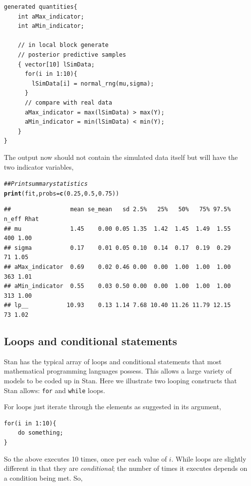 \documentclass[11pt,fullpage]{book}
\makeatletter
\newenvironment{kframe}{%
	\def\at@end@of@kframe{}%
	\ifinner\ifhmode%
	\def\at@end@of@kframe{\end{minipage}}%
\begin{minipage}{\columnwidth}%
	\fi\fi%
	\def\FrameCommand##1{\hskip\@totalleftmargin \hskip-\fboxsep
		\colorbox{shadecolor}{##1}\hskip-\fboxsep
		\hskip-\linewidth \hskip-\@totalleftmargin \hskip\columnwidth}%
	\MakeFramed {\advance\hsize-\width
		\@totalleftmargin\z@ \linewidth\hsize
		\@setminipage}}%
{\par\unskip\endMakeFramed%
	\at@end@of@kframe}
\newcommand{\hlnum}[1]{\textcolor[rgb]{0.686,0.059,0.569}{#1}}%
\newcommand{\hlcom}[1]{\textcolor[rgb]{0.678,0.584,0.686}{\textit{#1}}}%
\newcommand{\hlstd}[1]{\textcolor[rgb]{0.345,0.345,0.345}{#1}}%
\newcommand{\hlkwc}[1]{\textcolor[rgb]{0.333,0.667,0.333}{#1}}%
\newcommand{\hlkwd}[1]{\textcolor[rgb]{0.737,0.353,0.396}{\textbf{#1}}}%
\newenvironment{knitrout}{}{} %
\makeatother
\begin{document}
\begin{verbatim}
generated quantities{
    int aMax_indicator;
    int aMin_indicator;
      
    // in local block generate 
    // posterior predictive samples
    { vector[10] lSimData;
      for(i in 1:10){
        lSimData[i] = normal_rng(mu,sigma);
      }
      // compare with real data 
      aMax_indicator = max(lSimData) > max(Y);
      aMin_indicator = min(lSimData) < min(Y);
    }
}
\end{verbatim}

The output now should not contain the simulated data itself but will have the two indicator variables,

\begin{knitrout}\small
		\color{fgcolor}\begin{kframe}
			\begin{alltt}
				\hlcom{## Print summary statistics}
				\hlkwd{print}\hlstd{(fit,}\hlkwc{probs} \hlstd{=} \hlkwd{c}\hlstd{(}\hlnum{0.25}\hlstd{,} \hlnum{0.5}\hlstd{,} \hlnum{0.75}\hlstd{))}
			\end{alltt}
			\begin{verbatim}
##                 mean se_mean   sd 2.5%   25%   50%   75% 97.5% n_eff Rhat
## mu              1.45    0.00 0.05 1.35  1.42  1.45  1.49  1.55   400 1.00
## sigma           0.17    0.01 0.05 0.10  0.14  0.17  0.19  0.29    71 1.05
## aMax_indicator  0.69    0.02 0.46 0.00  0.00  1.00  1.00  1.00   363 1.01
## aMin_indicator  0.55    0.03 0.50 0.00  0.00  1.00  1.00  1.00   313 1.00
## lp__           10.93    0.13 1.14 7.68 10.40 11.26 11.79 12.15    73 1.02
			\end{verbatim}
		\end{kframe}
	\end{knitrout}


\subsection{Loops and conditional statements}
Stan has the typical array of loops and conditional statements that most mathematical programming languages possess. This allows a large variety of models to be coded up in Stan. Here we illustrate two looping constructs that Stan allows: \texttt{for} and \texttt{while} loops.

For loops just iterate through the elements as suggested in its argument,

\begin{verbatim}
for(i in 1:10){
    do something;
}
\end{verbatim} 
So the above executes 10 times, once per each value of $i$. While loops are slightly different in that they are \textit{conditional}; the number of times it executes depends on a condition being met. So,
\end{document}
